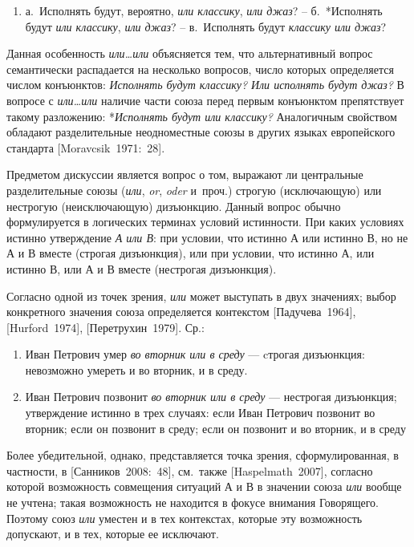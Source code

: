 \begin{enumerate}
  \def\labelenumi{(\arabic{enumi})}
  \setcounter{enumi}{172}
  \item
        а.~Исполнять будут, вероятно, \textit{или классику}, \textit{или джаз}? --
        б.~*Исполнять будут \textit{или классику}, \textit{или джаз}? --
        в.~Исполнять будут \textit{классику или джаз}?
\end{enumerate}

Данная особенность \textit{или\ldots или} объясняется тем, что
альтернативный вопрос семантически распадается на несколько вопросов,
число которых определяется числом конъюнктов: \textit{Исполнять будут
  классику?} \textit{Или исполнять будут джаз?} В вопросе с
\textit{или\ldots или} наличие части союза перед первым конъюнктом
препятствует такому разложению: *\textit{Исполнять будут или классику?}
Аналогичным свойством обладают разделительные неодноместные союзы в
других языках европейского стандарта {[}Moravcsik~1971:~28{]}.

Предметом дискуссии является вопрос о том, выражают ли центральные
разделительные союзы (\textit{или}, \textit{or}, \textit{oder} и~проч.)
строгую (исключающую) или нестрогую (неисключающую) дизъюнкцию. Данный
вопрос обычно формулируется в логических терминах условий истинности.
При каких условиях истинно утверждение \textit{А или В}: при условии, что
истинно А или истинно В, но не А и В вместе (строгая дизъюнкция), или
при условии, что истинно А, или истинно В, или А и В вместе (нестрогая
дизъюнкция).

Согласно одной из точек зрения, \textit{или} может выступать в двух
значениях; выбор конкретного значения союза определяется контекстом
{[}Падучева~1964{]}, {[}Hurford~1974{]}, {[}Перетрухин~1979{]}. Ср.:

\begin{enumerate}
  \def\labelenumi{(\arabic{enumi})}
  \setcounter{enumi}{173}
  \item
        Иван Петрович умер \textit{во вторник или в среду} --- cтрогая
        дизъюнкция: невозможно умереть и во вторник, и в среду.
  \item
        Иван Петрович позвонит \textit{во вторник или в среду} --- нестрогая
        дизъюнкция; утверждение истинно в трех случаях: если Иван Петрович
        позвонит во вторник; если он позвонит в среду; если он позвонит и во
        вторник, и в среду
\end{enumerate}

Более убедительной, однако, представляется точка зрения,
сформулированная, в частности, в {[}Санников~2008:~48{]}, см.~также
{[}Haspelmath~2007{]}, согласно которой возможность совмещения ситуаций
А и В в значении союза \textit{или} вообще не учтена; такая возможность не
находится в фокусе внимания Говорящего. Поэтому союз \textit{или} уместен
и в тех контекстах, которые эту возможность допускают, и в тех, которые
ее исключают.

